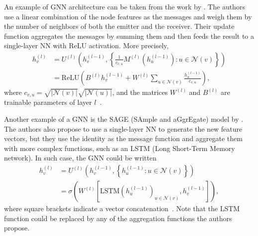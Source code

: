 An example of GNN architecture can be taken from the work by .
The authors use a linear combination of the node features as the messages and weigh them by the number of neighbors of both the emitter and the receiver.
Their update function aggregates the messages by summing them and then feeds the result to a single-layer NN with ReLU activation.
More precisely,
\begin{equation}\label{eq:graph-conv-kipf-2017}
\begin{aligned}
    h^{(l)}_v &= U^{(l)}\left( h^{(l-1)}_v, \left\{ \frac{1}{c_{v,u}}M^{(l)}(h^{(l-1)}_u):u\in \mathcal{N}(v) \right\}  \right)  \\
    &= \text{ReLU}\left( B^{(l)}h^{(l-1)}_v + W^{(l)} \sum_{u\in \mathcal{N}(v)} \frac{h^{(l-1)}_u }{c_{v,u}} \right)
,\end{aligned}
\end{equation}
where $c_{v,u}=\sqrt{|\mathcal{N}(v)|} \sqrt{|\mathcal{N}(u)|} $, and the matrices $W^{(l)}$ and $B^{(l)}$ are trainable parameters of layer $l$~\cite{sanchez-lengelingGentleIntroductionGraph2021}.

Another example of a GNN is the SAGE (SAmple and aGgrEgate) model by .
The authors also propose to use a single-layer NN to generate the new feature vectors, but they use the identity as the message function and aggregate them with more complex functions, such as an LSTM (Long Short-Term Memory network).
In such case, the GNN could be written
\begin{equation}\label{eq:graph-sage}
\begin{aligned}
    h^{(l)}_v &= U^{(l)}\left( h^{(l-1)}_v, \left\{ h^{(l-1)}_u:u\in \mathcal{N}(v) \right\}  \right)  \\
    &= \sigma\left( W^{(l)} \left[ \text{LSTM}\left( h^{(l-1)}_u \right)_{u\in \mathcal{N}(v)} , h^{(l-1)}_v \right]   \right)
,\end{aligned}
\end{equation}
where square brackets indicate a vector concatenation~\cite{sanchez-lengelingGentleIntroductionGraph2021}.
Note that the LSTM function could be replaced by any of the aggregation functions the authors propose.


